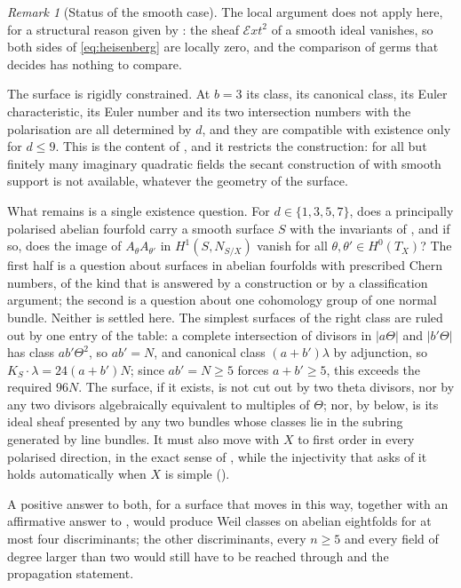 \documentclass[11pt,reqno]{amsart}
\theoremstyle{plain}
\theoremstyle{definition}
\theoremstyle{remark}
\newtheorem{remark}[theorem]{Remark}
\newcommand{\cE}{\mathcal{E}}
\begin{document}
\begin{remark}[Status of the smooth case]\label{rem:smoothremains}
The local argument does not apply here, for a structural reason given by
: the sheaf $\cE xt^{2}$ of a smooth ideal vanishes,
so both sides of \eqref{eq:heisenberg} are locally zero, and the comparison of
germs that decides  has nothing to compare.

The surface is rigidly constrained. At $b=3$ its class, its canonical class,
its Euler characteristic, its Euler number and its two intersection numbers
with the polarisation are all determined by $d$, and they are compatible with
existence only for $d\le9$. This is the content of
, and it restricts the construction: for all but
finitely many imaginary quadratic fields the secant construction of
 with smooth support is not available, whatever the
geometry of the surface.

What remains is a single existence question. For $d\in\{1,3,5,7\}$, does a
principally polarised abelian fourfold carry a smooth surface $S$ with the
invariants of , and if so, does the image of
$A_{\theta}A_{\theta'}$ in $H^{1}(S,N_{S/X})$ vanish for all
$\theta,\theta'\in H^{0}(T_{X})$? The first half is a question about surfaces
in abelian fourfolds with prescribed Chern numbers, of the kind that is
answered by a construction or by a classification argument; the second is a
question about one cohomology group of one normal bundle. Neither is settled
here. The simplest surfaces of the right class are ruled out by one entry of
the table: a complete intersection of divisors in $|a\Theta|$ and
$|b'\Theta|$ has class $ab'\Theta^{2}$, so $ab'=N$, and canonical class
$(a+b')\lambda$ by adjunction, so $K_{S}\cdot\lambda=24(a+b')N$; since
$ab'=N\ge5$ forces $a+b'\ge5$, this exceeds the required $96N$. The
surface, if it exists, is not cut out by two theta divisors, nor by any two
divisors algebraically equivalent to multiples of $\Theta$; nor, by
 below, is its ideal sheaf presented by any two bundles
whose classes lie in the subring generated by line bundles. It must also move
with $X$ to first order in every polarised direction, in the exact sense of
, while the injectivity that 
asks of it holds automatically when $X$ is simple ().

A positive answer to both, for a surface that moves in this way, together
with an affirmative answer to \cite[Question 11.4]{Mar25b}, would produce
Weil classes on abelian
eightfolds for at most four discriminants; the other discriminants, every
$n\ge5$ and every field of degree larger than two would still have to be
reached through \cite[Proposition~2.13]{paperIII} and the propagation statement.
\end{remark}
\end{document}
